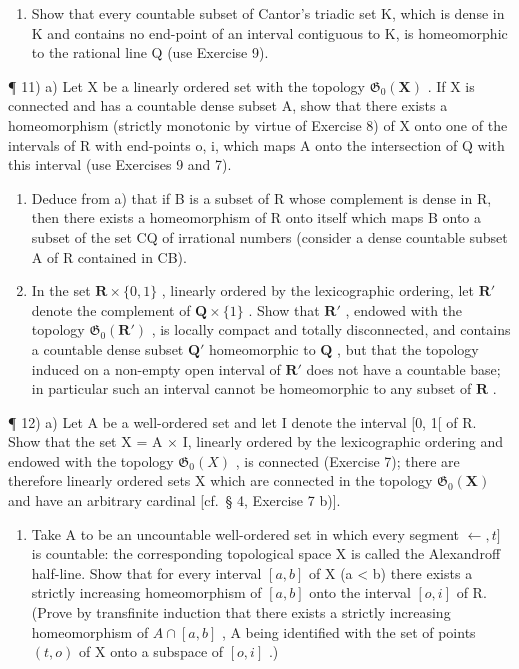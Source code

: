 \begin{enumerate}
\def\labelenumi{\arabic{enumi})}
\setcounter{enumi}{9}
\tightlist
\item
  Show that every countable subset of Cantor's triadic set K, which is dense in K and contains no end-point of an interval contiguous to K, is homeomorphic to the rational line Q (use Exercise 9).
\end{enumerate}

¶ 11) a) Let X be a linearly ordered set with the topology \(\mathfrak{G}_{0}(\mathbf{X})\) . If X is connected and has a countable dense subset A, show that there exists a homeomorphism (strictly monotonic by virtue of Exercise 8) of X onto one of the intervals of R with end-points o, i, which maps A onto the intersection of Q with this interval (use Exercises 9 and 7).

\begin{enumerate}
\def\labelenumi{\alph{enumi})}
\setcounter{enumi}{1}
\item
  Deduce from a) that if B is a subset of R whose complement is dense in R, then there exists a homeomorphism of R onto itself which maps B onto a subset of the set CQ of irrational numbers (consider a dense countable subset A of R contained in CB).
\item
  In the set \(\mathbf{R} \times \{0, 1\}\) , linearly ordered by the lexicographic ordering, let \(\mathbf{R}'\) denote the complement of \(\mathbf{Q} \times \{1\}\) . Show that \(\mathbf{R}'\) , endowed with the topology \(\mathfrak{G}_0(\mathbf{R}')\) , is locally compact and totally disconnected, and contains a countable dense subset \(\mathbf{Q}'\) homeomorphic to \(\mathbf{Q}\) , but that the topology induced on a non-empty open interval of \(\mathbf{R}'\) does not have a countable base; in particular such an interval cannot be homeomorphic to any subset of \(\mathbf{R}\) .
\end{enumerate}

¶ 12) a) Let A be a well-ordered set and let I denote the interval {[}0, 1{[} of R. Show that the set X = A × I, linearly ordered by the lexicographic ordering and endowed with the topology \(\mathfrak{G}_{0}(X)\) , is connected (Exercise 7); there are therefore linearly ordered sets X which are connected in the topology \(\mathfrak{G}_{0}(\mathbf{X})\) and have an arbitrary cardinal {[}cf.~§ 4, Exercise 7 b){]}.

\begin{enumerate}
\def\labelenumi{\alph{enumi})}
\setcounter{enumi}{1}
\tightlist
\item
  Take A to be an uncountable well-ordered set in which every segment \(\leftarrow, t]\) is countable: the corresponding topological space X is called the Alexandroff half-line. Show that for every interval \([a, b]\) of X (a \textless{} b) there exists a strictly increasing homeomorphism of \([a, b]\) onto the interval \([o, i]\) of R. (Prove by transfinite induction that there exists a strictly increasing homeomorphism of \(A \cap [a, b]\) , A being identified with the set of points \((t, o)\) of X onto a subspace of \([o, i]\) .)
\end{enumerate}


